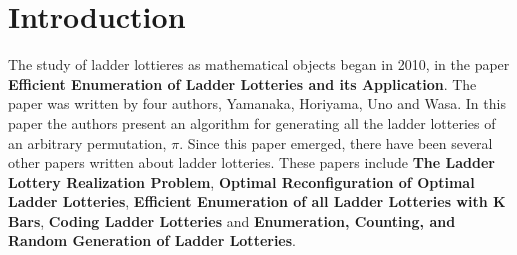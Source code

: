 \section{Introduction}
    The study of ladder lottieres as mathematical objects began in 2010, in  the paper
    \textbf{Efficient Enumeration of Ladder Lotteries and its Application}. The paper was 
    written by four authors, Yamanaka, Horiyama, Uno and Wasa. In this paper the 
    authors present an algorithm for generating all the ladder lotteries of an 
    arbitrary permutation, $\pi$. Since this paper emerged, there have been 
    several other papers written about ladder lotteries. 
    These papers include \textbf{The Ladder Lottery Realization Problem},
    \textbf{Optimal Reconfiguration of Optimal Ladder Lotteries}, 
    \textbf{Efficient Enumeration of all Ladder Lotteries with K Bars},
    \textbf{Coding Ladder Lotteries} and
    \textbf{Enumeration, Counting, and Random Generation of Ladder Lotteries}.


\pagebreak



\par


\par 





